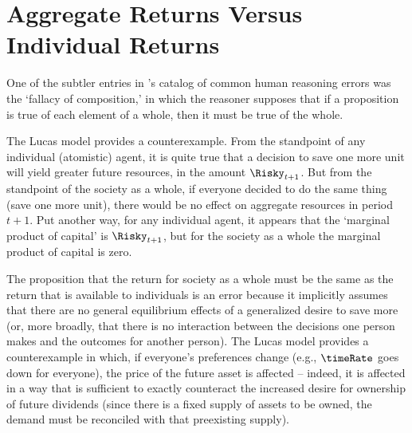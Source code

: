 \documentclass{handout}
\begin{document}

\section{Aggregate Returns Versus Individual Returns}

One of the subtler entries in \cite{aristotleFallacies}'s catalog of common human reasoning errors was the `fallacy of composition,' in which the reasoner supposes that if a proposition is true of each element of a whole, then it must be true of the whole.

The Lucas model provides a counterexample.  From the standpoint of any individual (atomistic) agent, it is quite true that a decision to save one more unit will yield greater future resources, in the amount $\Risky_{t+1}$.  But from the standpoint of the society as a whole, if everyone decided to do the same thing (save one more unit), there would be no effect on aggregate resources in period $t+1$.  Put another way, for any individual agent, it appears that the `marginal product of capital' is $\Risky_{t+1}$, but for the society as a whole the marginal product of capital is zero.

The proposition that the return for society as a whole must be the same as the return that is available to individuals is an error because it implicitly assumes that there are no general equilibrium effects of a generalized desire to save more (or, more broadly, that there is no interaction between the decisions one person makes and the outcomes for another person).  The Lucas model provides a counterexample in which, if everyone's preferences change (e.g., $\timeRate$ goes down for everyone), the price of the future asset is affected -- indeed, it is affected in a way that is sufficient to exactly counteract the increased desire for ownership of future dividends (since there is a fixed supply of assets to be owned, the demand must be reconciled with that preexisting supply).
\end{document}
